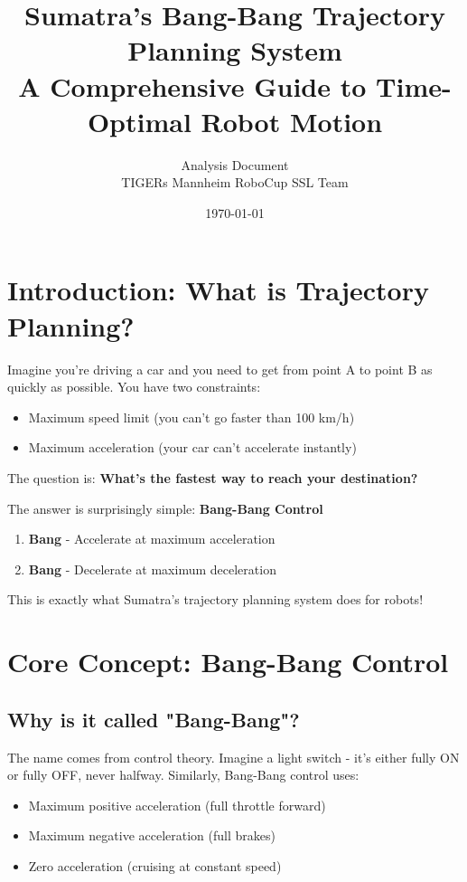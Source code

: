 \documentclass[12pt,a4paper]{article}
\title{Sumatra's Bang-Bang Trajectory Planning System\\
\large A Comprehensive Guide to Time-Optimal Robot Motion}
\author{Analysis Document\\TIGERs Mannheim RoboCup SSL Team}
\date{\today}
\begin{document}
\maketitle
\tableofcontents
\newpage

\section{Introduction: What is Trajectory Planning?}

Imagine you're driving a car and you need to get from point A to point B as quickly as possible. You have two constraints:
\begin{itemize}
    \item Maximum speed limit (you can't go faster than 100 km/h)
    \item Maximum acceleration (your car can't accelerate instantly)
\end{itemize}

The question is: \textbf{What's the fastest way to reach your destination?}

The answer is surprisingly simple: \textbf{Bang-Bang Control}
\begin{enumerate}
    \item \textbf{Bang} - Accelerate at maximum acceleration
    \item \textbf{Bang} - Decelerate at maximum deceleration
\end{enumerate}

This is exactly what Sumatra's trajectory planning system does for robots!

\section{Core Concept: Bang-Bang Control}

\subsection{Why is it called "Bang-Bang"?}

The name comes from control theory. Imagine a light switch - it's either fully ON or fully OFF, never halfway. Similarly, Bang-Bang control uses:
\begin{itemize}
    \item Maximum positive acceleration (full throttle forward)
    \item Maximum negative acceleration (full brakes)
    \item Zero acceleration (cruising at constant speed)
\end{itemize}
\end{document}
